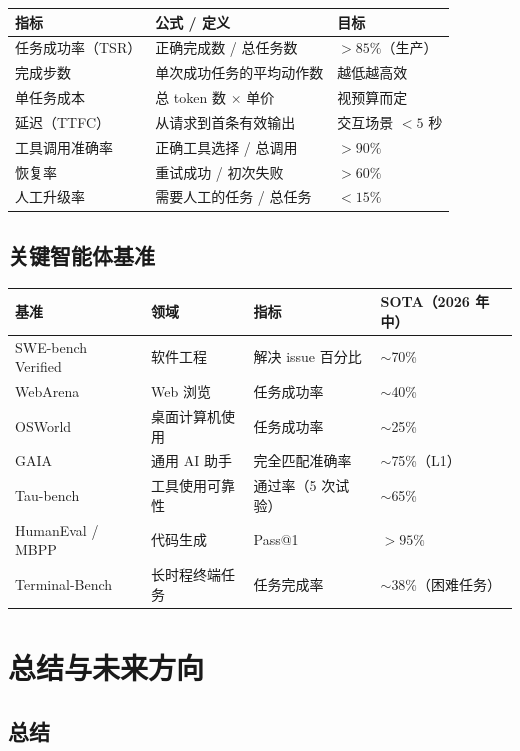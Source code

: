 \noindent\begin{tabularx}{\linewidth}{@{}l Z{1.47} Z{0.53}@{}}
\toprule
\textbf{指标} & \textbf{公式 / 定义} & \textbf{目标} \\
\midrule
任务成功率（TSR） & 正确完成数 / 总任务数 & $>85\%$（生产） \\
完成步数 & 单次成功任务的平均动作数 & 越低越高效 \\
单任务成本 & 总 token 数 $\times$ 单价 & 视预算而定 \\
延迟（TTFC） & 从请求到首条有效输出 & 交互场景 $<5$ 秒 \\
工具调用准确率 & 正确工具选择 / 总调用 & $>90\%$ \\
恢复率 & 重试成功 / 初次失败 & $>60\%$ \\
人工升级率 & 需要人工的任务 / 总任务 & $<15\%$ \\
\bottomrule
\end{tabularx}

\section{关键智能体基准}
\label{key-agentic-benchmarks}

\noindent\begin{tabularx}{\linewidth}{@{}l Z{0.85} Z{1.25} Z{1.0}@{}}
\toprule
\textbf{基准} & \textbf{领域} & \textbf{指标} & \textbf{SOTA（2026 年中）} \\
\midrule
SWE-bench Verified & 软件工程 & 解决 issue 百分比 & $\sim$70\% \\
WebArena & Web 浏览 & 任务成功率 & $\sim$40\% \\
OSWorld & 桌面计算机使用 & 任务成功率 & $\sim$25\% \\
GAIA & 通用 AI 助手 & 完全匹配准确率 & $\sim$75\%（L1） \\
Tau-bench & 工具使用可靠性 & 通过率（5 次试验） & $\sim$65\% \\
HumanEval / MBPP & 代码生成 & Pass@1 & $>95\%$ \\
Terminal-Bench & 长时程终端任务 & 任务完成率 & $\sim$38\%（困难任务） \\
\bottomrule
\end{tabularx}

\chapter{总结与未来方向}
\label{ch:conclusion}

\section{总结}
\label{summary-dup2}

